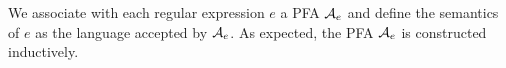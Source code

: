  
 
%




%  







We associate with each regular expression $e$ a PFA $\mathcal{A}_e$ and define the semantics of $e$ as the language accepted by $\mathcal{A}_e$. As expected, the PFA $\mathcal{A}_e$ is constructed inductively. 

